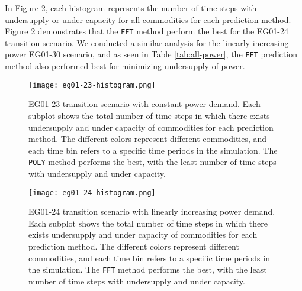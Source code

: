 In Figure \ref{fig:eg24under}, each histogram represents 
the number of time steps with undersupply or 
under capacity for all commodities for each prediction method.  
Figure \ref{fig:eg24under} demonstrates that the \texttt{FFT} method 
perform the best for the EG01-24 transition scenario.
We conducted a similar analysis for the linearly increasing power 
EG01-30 scenario, and 
as seen in Table \ref{tab:all-power}, the \texttt{FFT} prediction method 
also performed best for minimizing undersupply of power. 

\begin{figure}[]
	\centering
	\texttt{[image: eg01-23-histogram.png]} 
	\caption{
	EG01-23 transition scenario with constant power demand. 
	Each subplot shows the total number of time steps in which there exists 
	undersupply and under capacity of commodities for each prediction method. 
	The different colors represent different commodities, and each time bin 
	refers to a specific time periods in the simulation.
	The \texttt{POLY} method performs the best, with the least number of 
	time steps with undersupply and under capacity.}
	\label{fig:eg23under}
\end{figure}

\begin{figure}[]
	\centering
	\texttt{[image: eg01-24-histogram.png]} 
	\caption{
	EG01-24 transition scenario with linearly increasing power demand. 
	Each subplot shows the total number of time steps in which there exists 
	undersupply and under capacity of commodities for each prediction method. 
	The different colors represent different commodities, and each time bin 
	refers to a specific time periods in the simulation.
	The \texttt{FFT} method performs the best, with the least number of 
	time steps with undersupply and under capacity.}
	\label{fig:eg24under}
\end{figure}

